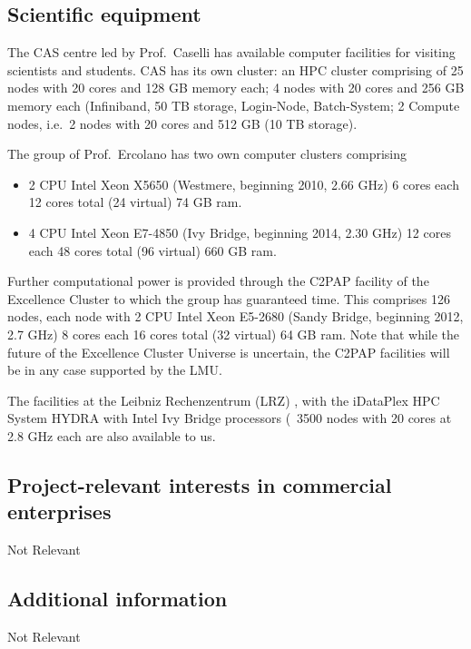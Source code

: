 \documentclass[10pt,fleqn,twoside]{article}
\begin{document}
\subsection{Scientific equipment}

The CAS centre led by Prof.\ Caselli has available computer facilities for visiting scientists and students. CAS has its own cluster: an HPC cluster comprising of 25 nodes with 20 cores and 128 GB memory each; 4 nodes with 20 cores and 256 GB memory each (Infiniband, 50 TB storage, Login-Node, Batch-System; 2 Compute nodes, i.e.\ 2 nodes with 20 cores and 512 GB (10 TB storage). 


The group of Prof.\ Ercolano has two own computer clusters comprising 

\begin{itemize}
\item 2 CPU Intel Xeon X5650 (Westmere, beginning
2010, 2.66 GHz) 6 cores each 12 cores total (24 virtual) 74 GB ram.

\item 4 CPU Intel Xeon E7-4850 (Ivy Bridge, beginning 2014, 2.30 GHz)
12 cores each 48 cores total (96 virtual) 660 GB ram.

\end{itemize}

Further computational power is provided through the C2PAP facility of the Excellence Cluster to which
the group has guaranteed time. This comprises 126 nodes, each node with 2 CPU Intel Xeon E5-2680 (Sandy
Bridge, beginning 2012, 2.7 GHz) 8 cores each 16 cores total (32
virtual) 64 GB ram. Note that while the future of the Excellence
Cluster Universe is uncertain, the C2PAP facilities will be in any
case supported by the LMU. 

The facilities at the Leibniz Rechenzentrum (LRZ) , with the iDataPlex
HPC System HYDRA with Intel Ivy Bridge processors (~3500 nodes with 20
cores at 2.8 GHz each are also available to us.

\subsection{Project-relevant interests in commercial enterprises}

Not Relevant


\subsection{Additional information}

Not Relevant
\end{document}
